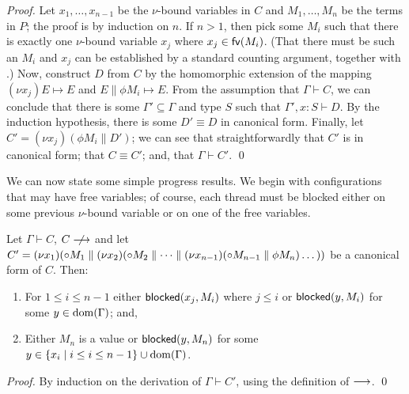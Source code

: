 \documentclass[orivec,envcountsame]{llncs}
\begin{document}
\begin{proof}
  Let $x_1,\dots,x_{n-1}$ be the $\nu$-bound variables in $C$ and $M_1,\dots,M_n$ be the terms in
  $P$; the proof is by induction on $n$.  If $n > 1$, then pick some $M_i$ such that there is
  exactly one $\nu$-bound variable $x_j$ where $x_j \in \mathsf{fv}(M_i)$.  (That there must be such an
  $M_i$ and $x_j$ can be established by a standard counting argument, together with
  .)  Now, construct $D$ from $C$ by the homomorphic extension of
  the mapping $(\nu x_j)E \mapsto E$ and $E \parallel \phi M_i \mapsto E$.  From the assumption that
  $\Gamma \vdash C$, we can conclude that there is some $\Gamma' \subseteq \Gamma$ and type $S$ such
  that $\Gamma',x:S \vdash D$.  By the induction hypothesis, there is some $D' \equiv D$ in
  canonical form.  Finally, let $C' = (\nu x_j)(\phi M_i \parallel D')$; we can see that
  straightforwardly that $C'$ is in canonical form; that $C \equiv C'$; and, that $\Gamma \vdash
  C'$. \qed
\end{proof}

We can now state some simple progress results.  We begin with configurations that may have free
variables; of course, each thread must be blocked either on some previous $\nu$-bound variable or on
one of the free variables.
%
\begin{theorem}\label{thm:progress-open}
  Let $\Gamma \vdash C$, $C \centernot\ceval$ and let $C' = (\nu x_1)({\mathord{\circ}} M_1 \parallel (\nu
  x_2)({\mathord{\circ}} M_2 \parallel \dots \parallel (\nu x_{n-1})({\mathord{\circ}} M_{n-1} \parallel \phi M_n)\dots))$ be a
  canonical form of $C$.  Then:
  \begin{enumerate}
  \item For $1 \leq i \leq n - 1$ either $\mathsf{blocked}(x_j,M_i)$ where $j \leq i$ or $\mathsf{blocked}(y,M_i)$
    for some $y \in \operatorname{dom}(\Gamma)$; and,
  \item Either $M_n$ is a value or $\mathsf{blocked}(y,M_n)$ for some $y \in \{ x_i \mid i \leq i \leq n -
    1 \} \cup \operatorname{dom}(\Gamma)$.
  \end{enumerate}
\end{theorem}
%
\begin{proof}
  By induction on the derivation of $\Gamma \vdash C'$, using the definition of $\longrightarrow$. \qed
\end{proof}
\end{document}
